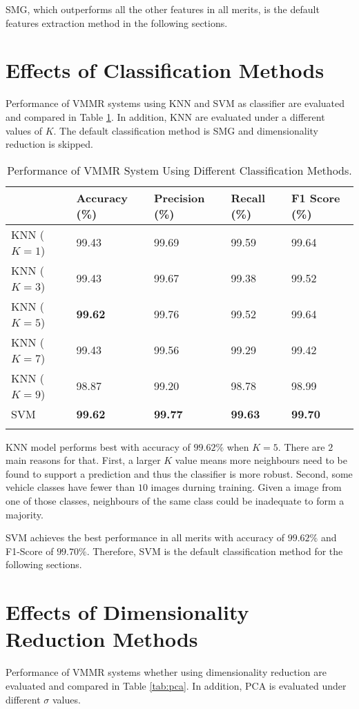 SMG, which outperforms all the other features in all merits, is the default features extraction method in the following sections.

\section{Effects of Classification Methods}
\label{sec:effects-cls}
Performance of VMMR systems using KNN and SVM as classifier are evaluated and compared in Table \ref{tab:classifiers}.
In addition, KNN are evaluated under a different values of $K$.
The default classification method is SMG and dimensionality reduction is skipped.

\begin{longtable}[]{@{}lllll@{}}
\toprule
& Accuracy (\%) & Precision (\%) & Recall (\%) & F1 Score
(\%)\tabularnewline
\midrule
\endhead
KNN (\(K=1\)) & 99.43 & 99.69 & 99.59 & 99.64\tabularnewline
KNN (\(K=3\)) & 99.43 & 99.67 & 99.38 & 99.52\tabularnewline
KNN (\(K=5\)) & \textbf{99.62} & 99.76 & 99.52 & 99.64\tabularnewline
KNN (\(K=7\)) & 99.43 & 99.56 & 99.29 & 99.42\tabularnewline
KNN (\(K=9\)) & 98.87 & 99.20 & 98.78 & 98.99\tabularnewline
SVM & \textbf{99.62} & \textbf{99.77} & \textbf{99.63} &
\textbf{99.70}\tabularnewline
\bottomrule
\caption{Performance of VMMR System Using Different Classification Methods.}
\label{tab:classifiers}
\end{longtable}


KNN model performs best with accuracy of $99.62\%$ when $K = 5$.
There are $2$ main reasons for that. 
First, a larger $K$ value means more neighbours need to be found to support a prediction and thus the classifier is more robust.
Second, some vehicle classes have fewer than $10$ images durning training. Given a image from one of those classes, neighbours of the same class could be inadequate to form a majority.

SVM achieves the best performance in all merits with accuracy of $99.62\%$ and F1-Score of $99.70\%$. 
Therefore, SVM is the default classification method for the following sections.

\section{Effects of Dimensionality Reduction Methods}
\label{sec:effects-dim}
Performance of VMMR systems whether using dimensionality reduction are evaluated and compared in Table \ref{tab:pca}.
In addition, PCA is evaluated under different $\sigma$ values.

